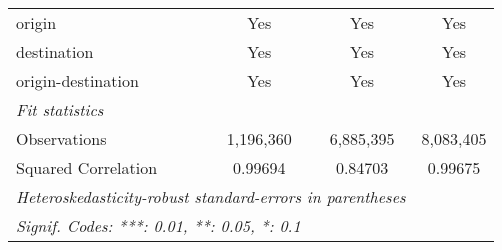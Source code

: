 \documentclass[10pt,a4paper]{article}
\begin{document}
\begin{tabular}{l c c c}
   origin                                           & Yes						& Yes						& Yes\\  
   destination                                      & Yes						& Yes						& Yes\\  
   origin-destination                               & Yes						& Yes						& Yes\\  
   \midrule
   \emph{Fit statistics}\\
   Observations                                     & 1,196,360 				& 6,885,395					& 8,083,405\\  
   Squared Correlation                              & 0.99694				& 0.84703					& 0.99675\\ 
   \midrule \midrule
   \multicolumn{3}{l}{\emph{Heteroskedasticity-robust standard-errors in parentheses}}\\
   \multicolumn{3}{l}{\emph{Signif. Codes: ***: 0.01, **: 0.05, *: 0.1}}\\
\end{tabular}
\par\endgroup
\end{document}
